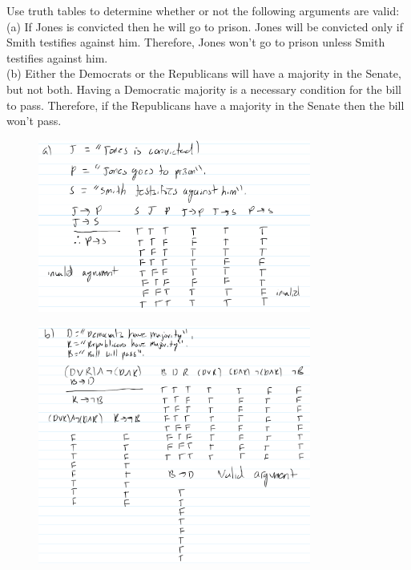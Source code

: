 \begin{tcolorbox}[title=Problem 5, breakable]
Use truth tables to determine whether or not the following arguments are valid: \\
(a) If Jones is convicted then he will go to prison. Jones will be convicted only if 
Smith testifies against him. Therefore, Jones won't go to prison unless Smith testifies
against him. \\
(b) Either the Democrats or the Republicans will have a majority in the Senate,
but not both. Having a Democratic majority is a necessary condition for the bill to
pass. Therefore, if the Republicans have a majority in the Senate then the bill
won't pass.
\end{tcolorbox}

\begin{figure}[H]
    \centering
    \includegraphics[width=0.8\textwidth]{images/1.2/31.PNG}
\end{figure}
\begin{figure}[H]
    \centering
    \includegraphics[width=0.8\textwidth]{images/1.2/32.PNG}
\end{figure}

